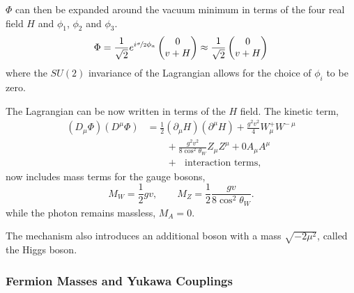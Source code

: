 $\Phi$ can then be expanded around the vacuum minimum in terms of the four real
field $H$ and $\phi_1$, $\phi_2$ and $\phi_3$.
\begin{equation}
\label{eq:phi}
\Phi = 
\frac{1}{\sqrt{2}}
e^{i\nicefrac{\sigma}{2}\phi_a}
\left(\begin{matrix}0\\v+H\end{matrix}\right)
\approx 
\frac{1}{\sqrt{2}}
\left(\begin{matrix}0\\v+H\end{matrix}\right)
\end{equation}
where the $SU(2)$ invariance of the Lagrangian allows for the choice of $\phi_i$
to be zero\cite{halzen1984quarks,ral}.

The Lagrangian can be now written in terms of the $H$ field. The kinetic
term,\cite{ral}
\begin{align}
\left(D_{\mu}\Phi\right) \left(D^{\mu}\Phi\right) 
&= \frac{1}{2} \left(\partial_{\mu}H\right) \left(\partial^{\mu}H\right) 
         + \frac{g^{2}v^{2}}{4} W_{\mu}^{+} W^{-~\mu} \nonumber \\
&\qquad{}+ \frac{g^{2}v^{2}}{8 \cos^{2}\theta_{W}} Z_{\mu} Z^{\mu} + 0 A_{\mu} A^{\mu} \nonumber \\
&\qquad{}+ \text{~ interaction terms},
\end{align}
now includes mass terms for the gauge bosons,
\begin{equation}
M_{W} = \frac{1}{2}gv, \qquad 
M_{Z} = \frac{1}{2}\frac{gv}{8\cos^{2}\theta_{W}} .
\end{equation}
while the photon remains massless, $M_{A}=0$.

The mechanism also introduces an additional boson with a mass
$\sqrt{-2\mu^{2}}$, called the Higgs boson.

\subsubsection{Fermion Masses and Yukawa Couplings}

